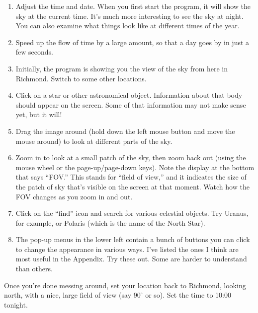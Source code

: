 \begin{enumerate}
\item Adjust the time and date. When you first start the 
program, it will show the sky at the current time.  It's much
more interesting to see the sky at night. You can
also examine what things look like at different times of the year.

\item Speed up the flow of time by a large amount, so that
a day goes by in just a few seconds.

\item Initially, the program is showing you the view of the sky
from here in Richmond. Switch to some other locations.

\item Click on a star or other astronomical object.
Information about that body should appear on the screen.
Some of that information may not make sense yet, but it will!

\item Drag the image around (hold down the left mouse button
and move the mouse around) to look at different parts 
of the sky.

\item Zoom in to look at a small patch of the sky, then
zoom back out
(using the mouse wheel or the page-up/page-down keys).
Note the display at the bottom that says ``FOV.'' This stands
for ``field of view,'' and it indicates the size of the patch of sky
that's visible on the screen at that moment. Watch how the FOV changes
as you zoom in and out.

\item Click on the ``find'' icon and search for various celestial
objects. 
Try Uranus, for example, or Polaris (which
is the name of the North Star).


\item The pop-up menus in the lower left
contain a bunch of buttons you can click to change
the appearance in various ways. I've listed the ones I think
are most useful in the Appendix. Try these out. Some are harder
to understand than others.

\end{enumerate}

\bigskip


Once you're done messing around, set your location back to Richmond,
looking north, with a nice, large field of view (say $90^\circ$ or so).
Set the
time to 10:00 tonight.

